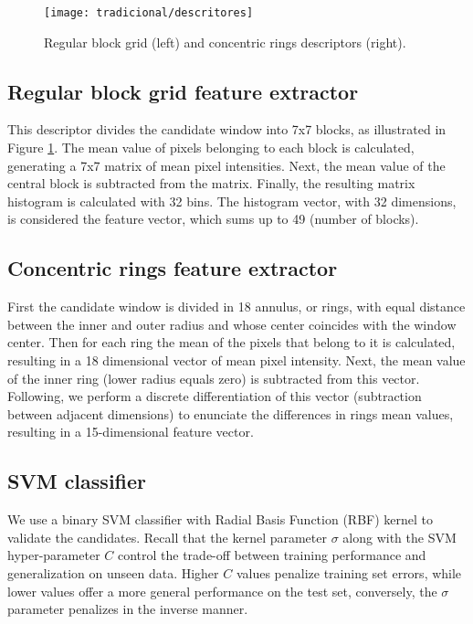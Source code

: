     \begin{figure}
    \centering
    \texttt{[image: tradicional/descritores]}
    \caption{Regular block grid (left) and concentric rings descriptors (right).}
    \label{fig:descriptors}
    \end{figure}

    \subsection{Regular block grid feature extractor}
      This descriptor divides the candidate window into 7x7 blocks, as illustrated in Figure \ref{fig:descriptors}. The mean value of pixels belonging to each block is calculated, generating a 7x7 matrix of mean pixel intensities. Next, the mean value of the central block is subtracted from the matrix. Finally, the resulting matrix histogram is calculated with 32 bins. The histogram vector, with 32 dimensions, is considered the feature vector, which sums up to 49 (number of blocks).

    \subsection{Concentric rings feature extractor}
       First the candidate window is divided in 18 annulus, or rings, with equal distance between the inner and outer radius and whose center coincides with the window center. Then for each ring the mean of the pixels that belong to it is calculated, resulting in a 18 dimensional vector of mean pixel intensity. Next, the mean value of the inner ring (lower radius equals zero) is subtracted from this vector. Following, we perform a discrete differentiation of this vector (subtraction between adjacent dimensions) to enunciate the differences in rings mean values, resulting in a 15-dimensional feature vector.

    \subsection{SVM classifier}
      We use a binary SVM classifier with Radial Basis Function (RBF) kernel \cite{rbfkernel} to validate the candidates. Recall that the kernel parameter $\sigma$ along with the SVM hyper-parameter $C$ control the trade-off between training performance and generalization on unseen data. Higher $C$ values penalize training set errors, while lower values offer a more general performance on the test set, conversely, the $\sigma$ parameter penalizes in the inverse manner.

